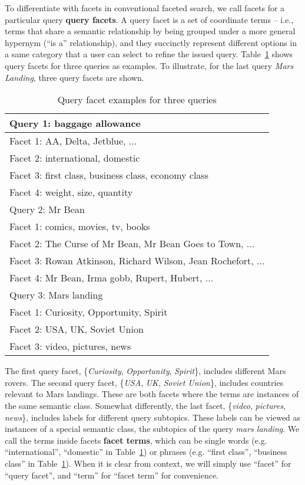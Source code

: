 To differentiate with facets in conventional faceted search, we call facets for a particular query \textbf{query facets}. A query facet is a set of coordinate terms -- i.e., terms that share a semantic relationship by being grouped under a more general hypernym (``is a'' relationship), and they succinctly represent different options in a same category that a user can select to refine the issued query. Table~\ref{tab:facetexample} shows query facets for three queries as examples. To illustrate, for the last query \textit{Mars Landing}, three query facets are shown.
\begin{table}[ht!]
\centering
\caption{Query facet examples for three queries}
\label{tab:facetexample}
\begin{tabular}{|l|} \hline
Query 1: baggage allowance \\\hline
Facet 1: AA, Delta, Jetblue,  ... \\
Facet 2: international, domestic \\
Facet 3: first class, business class, economy class \\
Facet 4: weight, size, quantity \\\hhline{|=|}
Query 2: Mr Bean \\\hline
Facet 1: comics, movies, tv, books \\
Facet 2: The Curse of Mr Bean, Mr Bean Goes to Town, ...\\
Facet 3: Rowan Atkinson, Richard Wilson, Jean Rochefort,  ...\\ 
Facet 4: Mr Bean, Irma gobb, Rupert, Hubert, ...\\\hhline{|=|}
Query 3: Mars landing \\\hline
Facet 1: Curiosity, Opportunity, Spirit \\
Facet 2: USA, UK, Soviet Union \\
Facet 3: video, pictures, news \\\hline
\end{tabular}
\end{table}
The first query facet, \{\textit{Curiosity}, \textit{Opportunity}, \textit{Spirit}\}, includes different Mars rovers. The second query facet, \{\textit{USA}, \textit{UK}, \textit{Soviet Union}\}, includes countries relevant to Mars landings. These are both facets where the terms are instances of the same semantic class. 
Somewhat differently, the last facet, \{\textit{video}, \textit{pictures}, \textit{news}\}, includes labels for different query subtopics. These labels can be viewed as instances of a special semantic class, the subtopics of the query \textit{mars landing}. We call the terms inside facets \textbf{facet terms}, which can be single words (e.g. ``international'', ``domestic'' in Table~\ref{tab:facetexample}) or phrases (e.g. ``first class'', ``business class'' in Table~\ref{tab:facetexample}). When it is clear from context, we will simply use ``facet'' for ``query facet'', and ``term'' for ``facet term'' for convenience.

